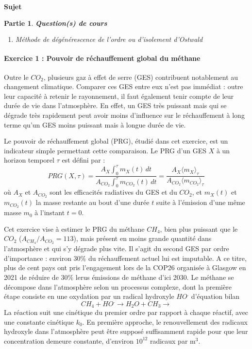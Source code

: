 \documentclass[a4paper,10pt,notitlepage,oneside]{article}
\theoremstyle{plain}
\newtheorem{partie}{\color{BlueViolet} Partie}
\begin{document}
\begin{center}
    {\color{BlueViolet} \Large \textbf{\color{BlueViolet}Sujet }}
\end{center}
\setcounter{partie}{0}
\begin{partie} \textbf{\color{BlueViolet} Question(s) de cours} 

\begin{enumerate}
    \item Méthode de dégénérescence de l’ordre ou d’isolement d’Ostwald
\end{enumerate}
\end{partie}

\paragraph{\color{BlueViolet} Exercice 1 : Pouvoir de réchauffement global du méthane}

Outre le $CO_2$, plusieurs gaz à effet de serre (GES) contribuent notablement au changement climatique. Comparer ces GES entre eux n’est pas immédiat : outre leur capacité à retenir le rayonnement, il faut également tenir compte de leur durée de vie dans l’atmosphère. En effet, un GES très puissant mais qui se dégrade très rapidement peut avoir moins d’influence sur le réchauffement à long terme qu’un GES moins puissant mais à longue durée de vie.

Le pouvoir de réchauffement global (PRG), étudié dans cet exercice, est un indicateur simple permettant cette comparaison. Le PRG d’un GES $ X $ à un horizon temporel $ \tau $ est défini par :
\[
PRG(X, \tau) = \frac{A_X \displaystyle{\int_{0}^{\tau}} m_X(t) \, dt}{A_{{CO_2}}\displaystyle{\int_{0}^{\tau}} m_{{CO_2}}(t) \, dt} = \dfrac{A_X\langle m_X\rangle_\tau}{A_{CO_2} \langle m_{CO_2} \rangle_\tau}
\]
où $ A_X $ et $A_{CO_2}$  sont les efficacités radiatives du GES et du $CO_2$, et $m_X(t)$ et $m_{{CO_2}}(t)$ la masse restante au bout d’une durée $ t $ suite à l’émission d’une même masse $ m_0 $ à l’instant $ t = 0 $.

Cet exercice vise à estimer le PRG du méthane $CH_4$, bien plus puissant que le $CO_2$ ($ A_{CH_4} / A_{CO_2} = 113 $), mais présent en moins grande quantité dans l’atmosphère et qui s’y dégrade plus vite. Il s'agit du second GES par ordre d'importance : environ $30\%$ du réchauffement actuel lui est imputable. A ce titre, plus de cent pays ont pris l'engagement lors de la COP26 organisée à Glasgow en 2021 de réduire de $30\%$ lerus émissions de méthane d'ici 2030.
Le méthane se décompose dans l’atmosphère selon un processus complexe, dont la première étape consiste en
une oxydation par un radical hydroxyle $HO^.$ d’équation bilan
\begin{equation*}
    CH_4+HO^.\rightarrow H_2O+CH_3 \rightarrow
\end{equation*}
La réaction suit une cinétique du premier ordre par rapport à chaque réactif, avec une constante cinétique $k_0$. En première approche, le renouvellement des radicaux hydroxyle dans l’atmosphère peut être supposé suffisamment rapide pour que leur concentration demeure constante, d’environ $ 10^{12} $ radicaux par $\text{m}^3$.
\end{document}
